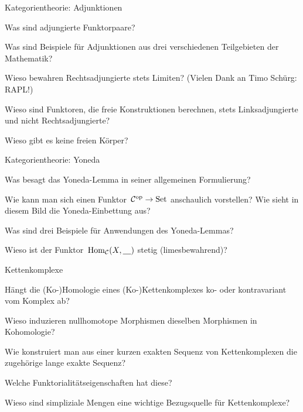 \documentclass{uebblatt}
\begin{document}
\begin{aufgabeE}{Kategorientheorie: Adjunktionen}
\item Was sind adjungierte Funktorpaare?
\item Was sind Beispiele für Adjunktionen aus drei verschiedenen Teilgebieten
der Mathematik?
\item Wieso bewahren Rechtsadjungierte stets Limiten? (Vielen Dank an Timo
Schürg: RAPL!)
\item Wieso sind Funktoren, die freie Konstruktionen berechnen, stets
Linksadjungierte und nicht Rechtsadjungierte?
\item Wieso gibt es keine freien Körper?
\end{aufgabeE}

\begin{aufgabeE}{Kategorientheorie: Yoneda}
\item Was besagt das Yoneda-Lemma in seiner allgemeinen Formulierung?
\item Wie kann man sich einen Funktor~$\mathcal{C}^{\mathrm{op}} \to \mathrm{Set}$ anschaulich vorstellen?
Wie sieht in diesem Bild die Yoneda-Einbettung aus?
\item Was sind drei Beispiele für Anwendungen des Yoneda-Lemmas?
\item Wieso ist der Funktor~$\mathrm{Hom}_{\mathcal{C}}(X,\underline{\quad})$ stetig (limesbewahrend)?
\end{aufgabeE}

\begin{aufgabeE}{Kettenkomplexe}
\item Hängt die (Ko-)Homologie eines (Ko-)Kettenkomplexes ko- oder
kontravariant vom Komplex ab?
\item Wieso induzieren nullhomotope Morphismen dieselben Morphismen in
Kohomologie?
\item Wie konstruiert man aus einer kurzen exakten Sequenz von Kettenkomplexen
die zugehörige lange exakte Sequenz?
\item Welche Funktorialitätseigenschaften hat diese?
\item Wieso sind simpliziale Mengen eine wichtige Bezugsquelle für
Kettenkomplexe?
\end{aufgabeE}
\end{document}
